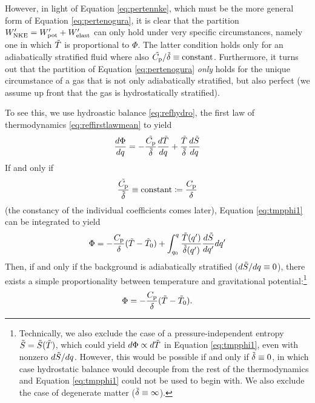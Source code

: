 \documentclass[12pt]{article}
\newcommand{\wpnke}{W^\prime_{\rm NKE}}
\newcommand{\wppot}{W^\prime_{\rm pot}}
\newcommand{\wpelast}{W^\prime_{\rm elast}}
\begin{document}
However, in light of Equation \eqref{eq:pertennke}, which must be the more general form of Equation \eqref{eq:pertenogura}, it is clear that the partition $\wpnke = \wppot + \wpelast$ can only hold under very specific circumstances, namely one in which $\tilde{T}$ is proportional to $\Phi$. The latter condition holds only for an adiabatically stratified fluid where also $\tilde{C_{\rm{p}}}/\tilde{\delta}\equiv\text{constant}$. Furthermore, it turns out that the partition of Equation \eqref{eq:pertenogura} \textit{only} holds for the unique circumstance of a gas that is not only adiabatically stratified, but also perfect (we assume up front that the gas is hydrostatically stratified). 

To see this, we use hydroastic balance \eqref{eq:refhydro}, the first law of thermodynamics \eqref{eq:reffirstlawmean} to yield
\begin{align}\label{eq:tmpphi1}
	\frac{d\Phi}{dq} = -\frac{\tilde{C_{\rm{p}}}}{\tilde{\delta}}\frac{d\tilde{T}}{dq} + \frac{\tilde{T}}{\tilde{\delta}}\frac{d\tilde{S}}{dq}
\end{align}
If and only if 
\begin{align}\label{eq:cpdeltaconst}
	\frac{\tilde{C_{\rm{p}}}}{\tilde{\delta}} \equiv \text{constant} \coloneqq \frac{C_{\rm{p}}}{\delta}
\end{align}
(the constancy of the individual coefficients comes later), Equation \eqref{eq:tmpphi1} can be integrated to yield
\begin{align}\label{eq:tmpphi2}
	\Phi = -\frac{C_{\rm{p}}}{\delta}(\tilde{T}-\tilde{T}_0) + \int_{q_0}^q\frac{\tilde{T}(q^\prime)}{\tilde{\delta}(q^\prime)}\frac{d\tilde{S}}{dq^\prime}dq^\prime
\end{align}
Then, if and only if the background is adiabatically stratified ($d\tilde{S}/dq\equiv0$), there exists a simple proportionality between temperature and gravitational potential:\footnote{Technically, we also exclude the case of a pressure-independent entropy $\tilde{S}=\tilde{S}(\tilde{T})$, which could yield $d\Phi\propto d\tilde{T}$ in Equation \eqref{eq:tmpphi1}, even with nonzero $d\tilde{S}/dq$. However, this would be possible if and only if $\tilde{\delta}\equiv0$, in which case hydrostatic balance would decouple from the rest of the thermodynamics and Equation \eqref{eq:tmpphi1} could not be used to begin with. We also exclude the case of degenerate matter ($\tilde{\delta}\equiv\infty$). }
\begin{align}\label{eq:tmpphi3}
	\Phi = -\frac{C_{\rm{p}}}{\delta}(\tilde{T}-\tilde{T}_0).
\end{align}
\end{document}
